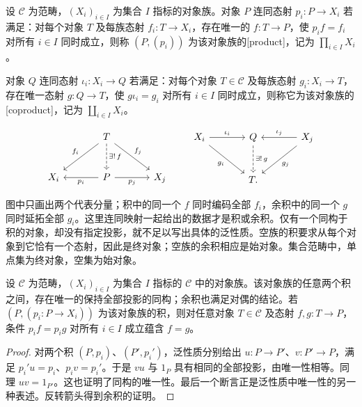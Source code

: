 \begin{definition}[积与余积]\label{b4:def:product-coproduct}
	设 \(\mathcal C\) 为范畴，\((X_i)_{i\in I}\) 为集合 \(I\) 指标的对象族。对象 \(P\) 连同态射 \(p_i:P\rightarrow X_i\) 若满足：对每个对象 \(T\) 及每族态射 \(f_i:T\rightarrow X_i\)，存在唯一的 \(f:T\rightarrow P\)，使 \(p_if=f_i\) 对所有 \(i\in I\) 同时成立，则称 \((P,(p_i))\) 为该对象族的[product]，记为 \(\prod_{i\in I}X_i\)。

	\ProseParagraphBreak
	对象 \(Q\) 连同态射 \(\iota_i:X_i\rightarrow Q\) 若满足：对每个对象 \(T\in\mathcal C\) 及每族态射 \(g_i:X_i\rightarrow T\)，存在唯一态射 \(g:Q\rightarrow T\)，使 \(g\iota_i=g_i\) 对所有 \(i\in I\) 同时成立，则称它为该对象族的[coproduct]，记为 \(\coprod_{i\in I}X_i\)。
\end{definition}

\[
	\begin{tikzcd}[column sep=large,row sep=large]
		&T\arrow[dl,"f_i"']\arrow[d,dashed,"\exists!\,f"]\arrow[dr,"f_j"]&\\
		X_i&P\arrow[l,"p_i"]\arrow[r,"p_j"']&X_j
	\end{tikzcd}
	\qquad
	\begin{tikzcd}[column sep=large,row sep=large]
		X_i\arrow[r,"\iota_i"]\arrow[dr,"g_i"']&Q\arrow[d,dashed,"\exists!\,g"]& X_j\arrow[l,"\iota_j"']\arrow[dl,"g_j"]\\
		&T.&
	\end{tikzcd}
\]

图中只画出两个代表分量；积中的同一个 \(f\) 同时编码全部 \(f_i\)，余积中的同一个 \(g\) 同时延拓全部 \(g_i\)。这里连同映射一起给出的数据才是积或余积。仅有一个同构于积的对象，却没有指定投影，就不足以写出具体的泛性质。空族的积要求从每个对象到它恰有一个态射，因此是终对象；空族的余积相应是始对象。集合范畴中，单点集为终对象，空集为始对象。

\begin{proposition}[积与余积的唯一性]\label{b4:prop:product-unique}
	设 \(\mathcal C\) 为范畴，\((X_i)_{i\in I}\) 为集合 \(I\) 指标的 \(\mathcal C\) 中的对象族。该对象族的任意两个积之间，存在唯一的保持全部投影的同构；余积也满足对偶的结论。若 \((P,(p_i:P\rightarrow X_i))\) 为该对象族的积，则对任意对象 \(T\in\mathcal C\) 及态射 \(f,g:T\rightarrow P\)，条件 \(p_if=p_ig\) 对所有 \(i\in I\) 成立蕴含 \(f=g\)。
\end{proposition}
\begin{proof}
	对两个积 \((P,p_i)\)、\((P',p_i')\)，泛性质分别给出 \(u:P\rightarrow P'\)、\(v:P'\rightarrow P\)，满足 \(p_i'u=p_i\)、\(p_iv=p_i'\)。于是 \(vu\) 与 \(1_P\) 具有相同的全部投影，由唯一性相等。同理 \(uv=1_{P'}\)。这也证明了同构的唯一性。最后一个断言正是泛性质中唯一性的另一种表述。反转箭头得到余积的证明。
\end{proof}


